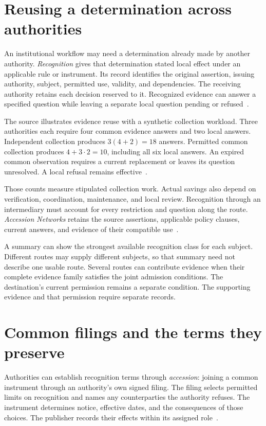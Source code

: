\documentclass{momentum}
\begin{document}
\section{Reusing a determination across authorities}
\label{sec:recognition}

An institutional workflow may need a determination already made by another authority. \emph{Recognition} gives that determination stated local effect under an applicable rule or instrument.
Its record identifies the original assertion, issuing authority, subject, permitted use, validity, and dependencies.
The receiving authority retains each decision reserved to it.
Recognized evidence can answer a specified question while leaving a separate local question pending or refused~\cite[Sections~2 and 5]{entity}.

The source illustrates evidence reuse with a synthetic collection workload.
Three authorities each require four common evidence answers and two local answers.
Independent collection produces \(3(4+2)=18\) answers.
Permitted common collection produces \(4+3\cdot2=10\), including all six local answers.
An expired common observation requires a current replacement or leaves its question unresolved.
A local refusal remains effective~\cite[Section~10]{entity}.

Those counts measure stipulated collection work.
Actual savings also depend on verification, coordination, maintenance, and local review.
Recognition through an intermediary must account for every restriction and question along the route.
\emph{Accession Networks} retains the source assertions, applicable policy clauses, current answers, and evidence of their compatible use~\cite[Sections~5.2 and 6.3]{accession}.

A summary can show the strongest available recognition class for each subject.
Different routes may supply different subjects, so that summary need not describe one usable route.
Several routes can contribute evidence when their complete evidence family satisfies the joint admission conditions.
The destination's current permission remains a separate condition.
The supporting evidence and that permission require separate records.

\section{Common filings and the terms they preserve}
\label{sec:accession}

Authorities can establish recognition terms through \emph{accession}: joining a common instrument through an authority's own signed filing.
The filing selects permitted limits on recognition and names any counterparties the authority refuses.
The instrument determines notice, effective dates, and the consequences of those choices.
The publisher records their effects within its assigned role~\cite[Sections~2.2 and 6]{accession}.
\end{document}
